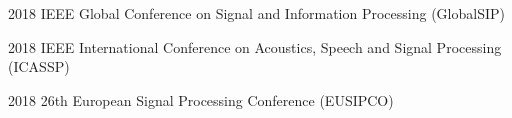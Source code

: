 

\begin{cventries}
                  {2018}
                  {IEEE Global Conference on Signal and Information Processing (GlobalSIP)} %

                  {2018}
                  {IEEE International Conference on Acoustics, Speech and Signal Processing (ICASSP)} %

                  {2018}
                  {26th European Signal Processing Conference (EUSIPCO)} %



\end{cventries}
